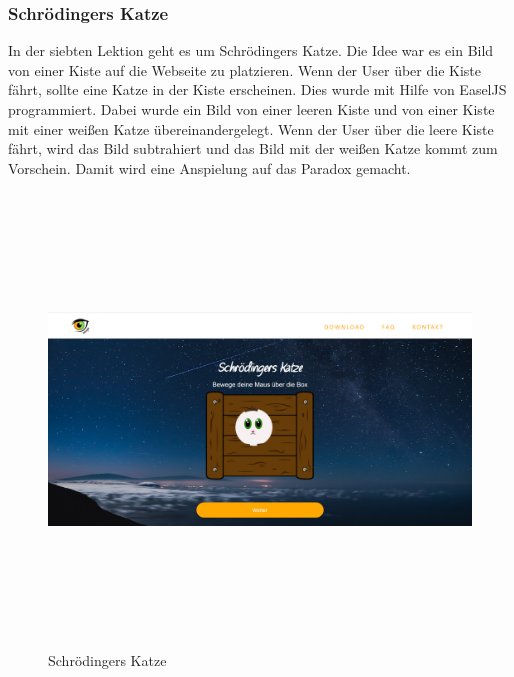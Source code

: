 \subsubsection{Schrödingers Katze}
In der siebten Lektion geht es um Schrödingers Katze. Die Idee war es ein Bild von einer Kiste auf die Webseite zu platzieren. Wenn der User über die Kiste fährt, sollte eine Katze in der Kiste erscheinen. Dies wurde mit Hilfe von EaselJS programmiert. Dabei wurde ein Bild von einer leeren Kiste und von einer Kiste mit einer weißen Katze übereinandergelegt. Wenn der User über die leere Kiste fährt, wird das Bild subtrahiert und das Bild mit der weißen Katze kommt zum Vorschein. Damit wird eine Anspielung auf das Paradox gemacht. 
\begin{figure} [h]
	\centering
\includegraphics[width=12cm,height=12cm,keepaspectratio]{webseite_katze} 
	\caption{Schrödingers Katze}
\end{figure}
